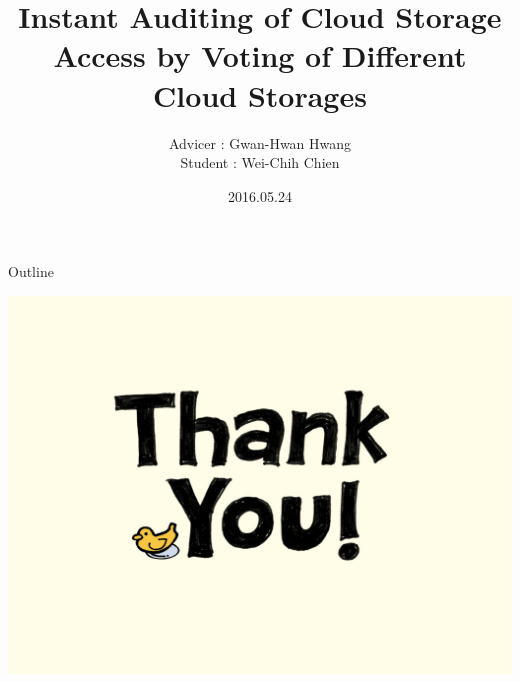 \documentclass{beamer}
\title[Progress Report]{Instant Auditing of Cloud Storage Access by Voting of Different Cloud Storages}
\author[Wei-Chih Chien]{Advicer : Gwan-Hwan Hwang \texorpdfstring{\\ Student : Wei-Chih Chien}{}}
\institute[NTNU CSIE CCLAB]{NTNU CSIE CCLAB}
\date{2016.05.24}
\begin{document}
\begin{CJK}{UTF8}{bsmi}

\begin{frame}
  \titlepage
\end{frame}

\begin{frame}{Outline}
  \tableofcontents
\end{frame}






\begin{frame}
	\begin{center}
		\includegraphics[width=\textwidth]{thank_you.jpg}
	\end{center}	
\end{frame}

\end{CJK}
\end{document}

